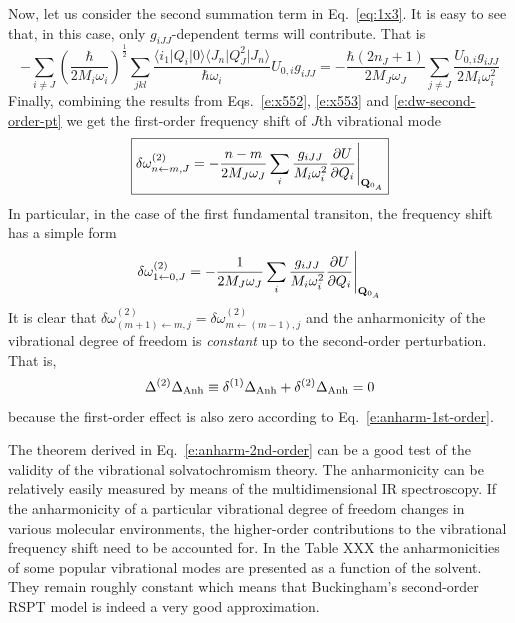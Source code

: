 \documentclass[a4paper,titlepage,twoside,fleqn,12pt]{book}
\begin{document}
\begin{refsection}
Now, let us consider the second summation term in Eq.~\eqref{eq:1x3}.
It is easy to see that, in this case, only $g_{iJJ}$-dependent terms will
contribute. That is
%
\begin{equation}  \label{e:x553}
-\sum_{i\ne J} \left( \frac{\hbar}{2M_i\omega_i} \right)^\frac{1}{2}  \sum_{jkl} 
\frac{\langle i_1 \vert Q_i \vert 0 \rangle 
      \langle J_n \vert Q_J^2 \vert J_n \rangle } {\hbar\omega_i}
U_{0,i} g_{iJJ} = 
-\frac{\hbar\left(2n_J+1\right)}{2M_J\omega_J} \sum_{j\ne J} \frac{U_{0,i} g_{iJJ}}{2M_i\omega_i^2}
\end{equation} 
%
Finally, combining the results from Eqs.~\eqref{e:x552}, \eqref{e:x553} and \eqref{e:dw-second-order-pt}
we get the first-order frequency shift of $J$th vibrational mode
%
\begin{equation}   \label{e:buckingham-2st-order}
\boxed{
\delta \omega_{n\leftarrow m,J}^{(2)} = 
-\frac{n-m}{2M_J\omega_J} \sum_{i} \frac{g_{iJJ}}{M_i\omega_i^2} 
\frac{\partial U}{\partial Q_i} \Bigg|_{{\bf Q}_{0_A}}
}
\end{equation}
%
In particular, in the case of the first fundamental transiton, the frequency shift 
has a simple form
%
\begin{equation}
\delta \omega_{1\leftarrow 0,J}^{(2)} = 
-\frac{1}{2M_J\omega_J} \sum_{i} \frac{g_{iJJ}}{M_i\omega_i^2} 
\frac{\partial U}{\partial Q_i} \Bigg|_{{\bf Q}_{0_A}}
\end{equation}
%
It is clear that $\delta \omega_{(m+1)\leftarrow m,j}^{(2)} = \delta \omega_{m\leftarrow (m-1),j}^{(2)}$
and the anharmonicity of the vibrational degree of freedom is \emph{constant}
up to the second-order perturbation. That is,
%
\begin{equation}  \label{e:anharm-2nd-order}
\Delta^{(2)} \Delta_{\rm Anh} \equiv \delta^{(1)} \Delta_{\rm Anh} + \delta^{(2)} \Delta_{\rm Anh} =  0
\end{equation}
%
because the first-order effect is also zero according to Eq.~\eqref{e:anharm-1st-order}. 

The theorem derived in Eq.~\eqref{e:anharm-2nd-order} can be a good test of the validity
of the vibrational solvatochromism theory. The anharmonicity can be relatively easily measured
by means of the multidimensional IR spectroscopy. If the anharmonicity of a particular vibrational 
degree of freedom changes in various molecular environments, the higher-order contributions 
to the vibrational frequency shift need to be accounted for. In the Table
XXX the anharmonicities of some popular vibrational modes are presented as a function of the solvent.
They remain roughly constant which means that Buckingham's second-order RSPT model is indeed 
a very good approximation.


\end{refsection}
\end{document}
